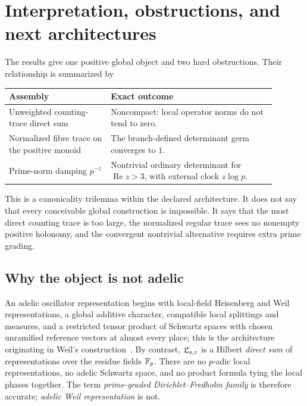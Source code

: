 \section{Interpretation, obstructions, and next architectures}
\label{sec:interpretation}

The results give one positive global object and two hard obstructions.  Their
relationship is summarized by

\begin{center}
\begin{tabular}{@{}p{0.34\linewidth}p{0.55\linewidth}@{}}
\toprule
Assembly & Exact outcome \\
\midrule
Unweighted counting-trace direct sum
& Noncompact: local operator norms do not tend to zero. \\
Normalized fibre trace on the positive monoid
& The branch-defined determinant germ converges to \(1\). \\
Prime-norm damping \(p^{-z}\)
& Nontrivial ordinary determinant for
  \(\operatorname{Re}z>3\), with external clock \(z\log p\). \\
\bottomrule
\end{tabular}
\end{center}

This is a canonicality trilemma within the declared architecture.  It does
not say that every conceivable global construction is impossible.  It says
that the most direct counting trace is too large, the normalized regular
trace sees no nonempty positive holonomy, and the convergent nontrivial
alternative requires extra prime grading.

\subsection{Why the object is not adelic}

An adelic oscillator representation begins with local-field Heisenberg and
Weil representations, a global additive character, compatible local
splittings and measures, and a restricted tensor product of Schwartz spaces
with chosen unramified reference vectors at almost every place; this is the
architecture originating in Weil's construction~\citep{weil1964}.  By
contrast, \(\mathfrak L_{s,z}\) is a Hilbert \emph{direct sum} of representations over
the residue fields \(\mathbb F_p\).  There are no \(p\)-adic local representations,
no adelic Schwartz space, and no product formula tying the local phases
together.  The term \emph{prime-graded Dirichlet--Fredholm family} is
therefore accurate; \emph{adelic Weil representation} is not.

